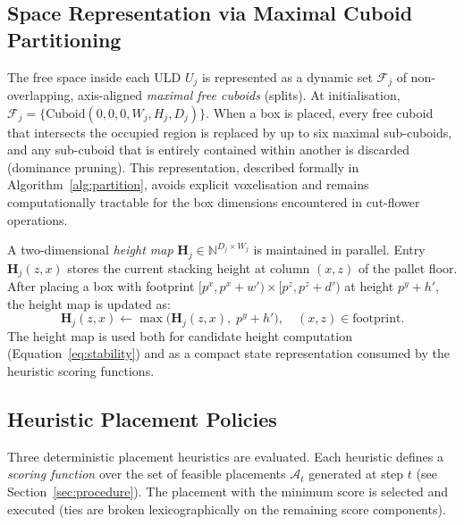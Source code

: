 
\subsection{Space Representation via Maximal Cuboid Partitioning}
\label{sec:space-rep}

The free space inside each ULD $U_j$ is represented as a dynamic set
$\mathcal{F}_j$ of non-overlapping, axis-aligned \emph{maximal free
cuboids} (splits).
At initialisation, $\mathcal{F}_j = \{\text{Cuboid}(0,0,0,W_j,H_j,D_j)\}$.
When a box is placed, every free cuboid that intersects the occupied region
is replaced by up to six maximal sub-cuboids, and any sub-cuboid that is
entirely contained within another is discarded (dominance pruning).
This representation, described formally in Algorithm~\ref{alg:partition},
avoids explicit voxelisation and remains computationally tractable for
the box dimensions encountered in cut-flower operations.

A two-dimensional \emph{height map} $\mathbf{H}_j \in \mathbb{N}^{D_j \times W_j}$
is maintained in parallel.
Entry $\mathbf{H}_j(z, x)$ stores the current stacking height at column
$(x, z)$ of the pallet floor.
After placing a box with footprint
$[p^x, p^x + w') \times [p^z, p^z + d')$ at height $p^y + h'$, the height
map is updated as:
\begin{equation}
\label{eq:hmap-update}
\mathbf{H}_j(z, x) \leftarrow
\max\!\bigl(\mathbf{H}_j(z, x),\; p^y + h'\bigr),
\quad (x,z) \in \text{footprint}.
\end{equation}
The height map is used both for candidate height computation
(Equation~\ref{eq:stability}) and as a compact state representation
consumed by the heuristic scoring functions.


\subsection{Heuristic Placement Policies}
\label{sec:heuristics}

Three deterministic placement heuristics are evaluated.
Each heuristic defines a \emph{scoring function} over the set of
feasible placements $\mathcal{A}_t$ generated at step $t$
(see Section~\ref{sec:procedure}).
The placement with the minimum score is selected and executed
(ties are broken lexicographically on the remaining score components).

